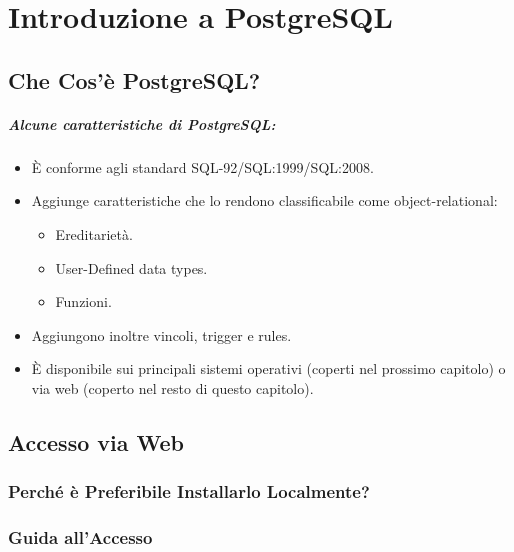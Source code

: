 \chapter{Introduzione a PostgreSQL}

\section{Che Cos'è PostgreSQL?}


\paragraph{Alcune caratteristiche di PostgreSQL:}

\begin{itemize}
  \item È conforme agli standard SQL-92/SQL:1999/SQL:2008. 
  \item Aggiunge caratteristiche che lo rendono classificabile come object-relational:
    \begin{itemize}
      \item Ereditarietà. 
      \item User-Defined data types. 
      \item Funzioni. 
    \end{itemize}
  \item Aggiungono inoltre vincoli, trigger e rules. 
  \item È disponibile sui principali sistemi operativi (coperti nel prossimo capitolo) o via web (coperto nel resto di questo capitolo).
\end{itemize}


\section{Accesso via Web}

\subsection{Perché è Preferibile Installarlo Localmente?}

\subsection{Guida all'Accesso}

